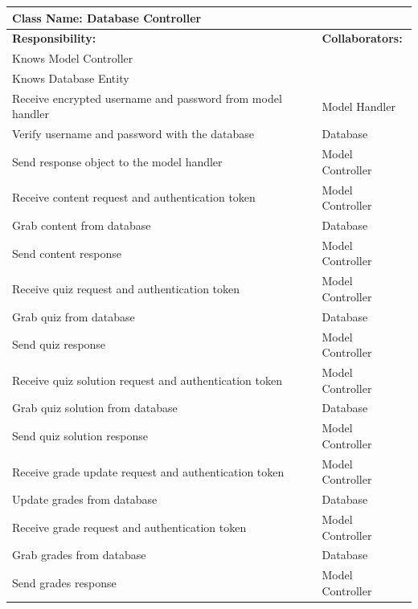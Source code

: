 \documentclass[]{article}
\begin{document}
\begin{enumerate}[a)]
	\begin{table}[H]
	\centering
		\begin{tabular}{|p{5cm}|p{5cm}|}
		\hline
		 \multicolumn{2}{|l|}{\textbf{Class Name: Database Controller}} \\
		\hline
		\textbf{Responsibility:} & \textbf{Collaborators:} \\
		\hline
		Knows Model Controller & \\
		\hline
		Knows Database Entity & \\
		\hline
		Receive encrypted username and password from model handler & Model Handler \\
		\hline
		Verify username and password with the database & Database \\
		\hline
		Send response object to the model handler & Model Controller \\
		\hline
		Receive content request and authentication token & Model Controller \\
		\hline
		Grab content from database & Database \\
		\hline
		Send content response & Model Controller \\
		\hline
		Receive quiz request and authentication token & Model Controller \\
		\hline
		Grab quiz from database & Database \\
		\hline
		Send quiz response & Model Controller \\
		\hline
		Receive quiz solution request and authentication token & Model 		Controller \\
		\hline
		Grab quiz solution from database & Database \\
		\hline
		Send quiz solution response & Model Controller \\
		\hline
		Receive grade update request and authentication token & Model Controller \\
		\hline
		Update grades from database & Database \\
		\hline
		Receive grade request and authentication token & Model 	Controller \\
		\hline
		Grab grades from database & Database \\
		\hline
		Send grades response & Model Controller \\
		\hline
		\end{tabular}
	\end{table}

\end{enumerate}
\end{document}
